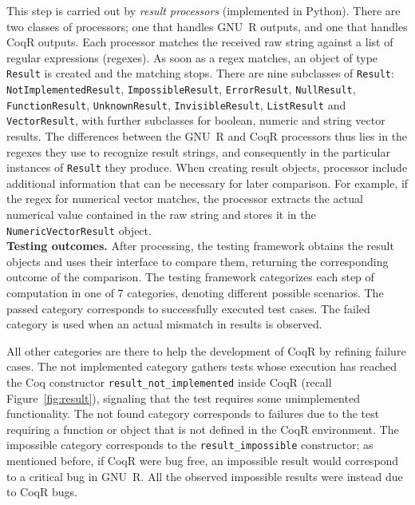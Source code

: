 \documentclass[
    sigplan,
    10pt,
    review, %
    natbib=false %
 ]{acmart}
\newcommand\CoqR{CoqR}
\begin{document}
This step is carried out by {\em result processors} (implemented in Python). There are two classes of processors; one that handles GNU~R outputs, and one that handles CoqR outputs.  Each processor matches the received raw string against a list of regular expressions (regexes). As soon as a regex matches, an object of type \texttt{Result} is created and the matching stops. There are nine subclasses of \texttt{Result}:
 \texttt{NotImplementedResult}, \texttt{ImpossibleResult}, \texttt{ErrorResult}, \texttt{NullResult}, \texttt{FunctionResult}, \texttt{UnknownResult}, \texttt{InvisibleResult},
 \texttt{ListResult} and \texttt{VectorResult}, with further subclasses for boolean, numeric and string vector results.
The differences between the GNU~R and \CoqR{} processors thus lies in the regexes they use to recognize result strings, and consequently in the particular instances of \texttt{Result} they produce.
%
When creating result objects, processor include additional information that can be necessary for later comparison. For example, if the regex for numerical vector matches, the processor extracts the actual numerical value contained in the raw string and stores it in the \texttt{NumericVectorResult} object. \\



\noindent\textbf{Testing outcomes.}
After processing, the testing framework obtains the result objects and uses their interface to compare them, returning the corresponding outcome of the comparison.
The testing framework categorizes each step of computation
in one of 7 categories, denoting different possible scenarios. The \textsf{passed} category corresponds to successfully executed test cases. The \textsf{failed} category is used when an actual mismatch in results is observed. 

All other categories are there to help the development of \CoqR{} by refining failure cases. The \textsf{not implemented} category gathers tests whose execution has reached the Coq constructor \texttt{result_not_implemented} inside \CoqR{} (recall Figure~\ref{fig:result}), signaling that the test requires some unimplemented functionality. The \textsf{not found} category corresponds to failures due to the test requiring a function or object that is not defined in the \CoqR{} environment. The \textsf{impossible} category corresponds to the \texttt{result_impossible} constructor; as mentioned before, if \CoqR{} were bug free, an impossible result would correspond to a critical bug in GNU~R. All the observed \textsf{impossible} results were instead due to \CoqR{} bugs.
\end{document}
